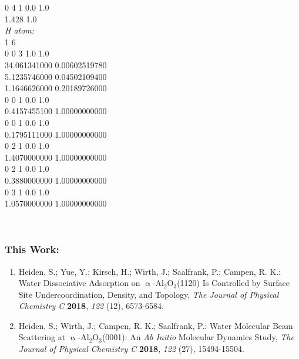\documentclass[11pt,DIV=13,BCOR=5mm,a4paper,headinclude]{scrbook}
\begin{document}
\begin{spacing}{0.5}
{0 4 1 0.0 1.0\\
 1.428             1.0\\
\textit{H atom:}\\
1 6\\
0 0 3 1.0 1.0\\
 34.061341000 0.00602519780\\
 5.1235746000 0.04502109400\\
 1.1646626000 0.20189726000\\
0 0 1 0.0 1.0\\
 0.4157455100 1.00000000000\\
0 0 1 0.0 1.0\\
 0.1795111000 1.00000000000\\
0 2 1 0.0 1.0\\
 1.4070000000 1.00000000000\\
0 2 1 0.0 1.0\\
 0.3880000000 1.00000000000\\
0 3 1 0.0 1.0\\
 1.0570000000 1.00000000000\\}
 \end{spacing}
\renewcommand{\cleardoublepage}{}
~
\clearpage
~
\clearpage
{}

\subsubsection{This Work:}

\begin{enumerate}[itemsep=0.25\baselineskip]
  \item Heiden, S.; Yue, Y.; Kirsch, H.; Wirth, J.; Saalfrank, P.; Campen, R. K.: {\frqq}Water Dissociative Adsorption on $\upalpha$-Al$_2$O$_3$(11\=20) Is Controlled by Surface Site Undercoordination, Density, and Topology{\flqq}, \textit{The Journal of Physical Chemistry C} \textbf{2018}, \textit{122} (12), 6573-6584.
  \item Heiden, S.; Wirth, J.; Campen, R. K.; Saalfrank, P.: {\frqq}Water Molecular Beam Scattering at $\upalpha$-Al$_2$O$_3$(0001): An \textit{Ab Initio} Molecular Dynamics Study{\flqq}, \textit{The Journal of Physical Chemistry C} \textbf{2018}, \textit{122} (27), 15494-15504.

\end{enumerate}
\end{document}
